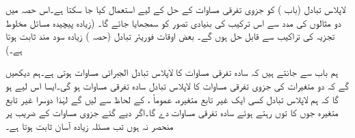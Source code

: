 لاپلاس تبادل (باب ) کو جزوی تفرقی مساوات کے حل کے لیے استعمال کیا جا سکتا ہے۔اس حصہ میں دو مثالوں کی مدد سے اس ترکیب کی بنیادی تصور کو سمجھایا جائے گا۔ (زیادہ پیچیدہ مسائل مخلوط تجزیہ کی تراکیب سے قابل حل ہوں گے۔ بعض اوقات فوریئر تبادل (حصہ ) زیادہ سود مند ثابت ہوتا ہے۔)

ہم باب  سے جانتے ہیں کہ سادہ تفرقی مساوات کا لاپلاس تبادل الجبرائی مساوات ہوتی ہے۔ہم دیکھیں گے کہ دو متغیرات کی جزوی تفرقی مساوات کا لاپلاس تبادل سادہ تفرقی مساوات ہو گی۔ایسا اس لیے ہو گا کہ ہم لاپلاس تبادل کسی ایک غیر تابع متغیرہ، عموماً ، کے لحاظ سے لیں گے لہٰذا دوسرا غیر تابع متغیرہ جوں کا توں رہتے ہوئے سادہ تفرقی مساوات دے گا۔اگر دیے گئے جزوی مساوات کے  ضریب   پر منحصر نہ ہوں تب مسئلہ زیادہ آسان ثابت ہوتا ہے۔

